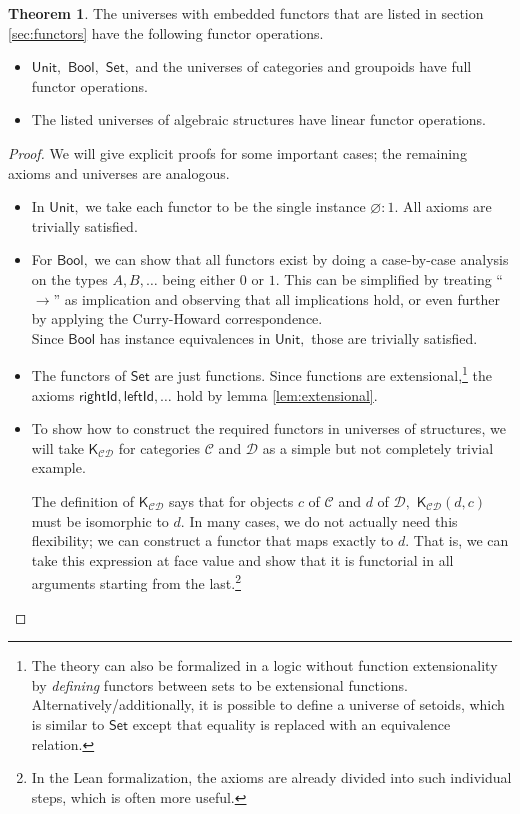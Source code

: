 \documentclass[a4paper]{article}
\theoremstyle{definition}
\newtheorem{theorem}[definition]{Theorem}
\theoremstyle{remark}
\renewcommand{\emptyset}{\varnothing}
\newcommand{\C}{\mathcal{C}}
\newcommand{\D}{\mathcal{D}}
\newcommand{\nm}{\mathsf}
\newcommand{\universe}{\nm}
\newcommand{\Unit}{\universe{Unit}}
\newcommand{\Bool}{\universe{Bool}}
\newcommand{\Set}{\universe{Set}}
\newcommand{\combinator}{\nm}
\newcommand{\constFun}{\combinator{K}}
\begin{document}
\begin{theorem}
  \label{thm:funop}
  The universes with embedded functors that are listed in section \ref{sec:functors} have the
  following functor operations.
  \begin{itemize}
    \item $\Unit,$ $\Bool,$ $\Set,$ and the universes of categories and groupoids have
    full functor operations.
    \item The listed universes of algebraic structures have linear functor operations.
  \end{itemize}
\end{theorem}

\begin{proof}
  We will give explicit proofs for some important cases; the remaining axioms and
  universes are analogous.
  \begin{itemize}
    \item In $\Unit,$ we take each functor to be the single instance $\emptyset : 1.$
    All axioms are trivially satisfied.
    \item For $\Bool,$ we can show that all functors exist by doing a case-by-case
    analysis on the types $A,B,\ldots$ being either $0$ or $1.$ This can be simplified by
    treating ``$\to$'' as implication and observing that all implications hold, or even
    further by applying the Curry-Howard correspondence\cite{Curry-Howard}.\\
    Since $\Bool$ has instance equivalences in $\Unit,$ those are trivially satisfied.
    \item The functors of $\Set$ are just functions. Since functions are
    extensional,\footnote{The theory can also be formalized in a logic without function
    extensionality by \emph{defining} functors between sets to be extensional functions.
    Alternatively/additionally, it is possible to define a universe of setoids, which
    is similar to $\Set$ except that equality is replaced with an equivalence relation.}
    the axioms $\nm{rightId},\nm{leftId},\ldots$ hold by lemma \ref{lem:extensional}.
    \item To show how to construct the required functors in universes of
    structures, we will take $\constFun_{\C\D}$ for categories $\C$ and $\D$ as a
    simple but not completely trivial example.

    The definition of $\constFun_{\C\D}$ says that for objects $c$ of $\C$ and $d$ of
    $\D,$ $\constFun_{\C\D}(d,c)$ must be isomorphic to $d.$ In many cases, we do not
    actually need this flexibility; we can construct a functor that maps exactly to
    $d.$ That is, we can take this expression at face value and show that it is
    functorial in all arguments starting from the last.\footnote{In the Lean
    formalization, the axioms are already divided into such individual steps, which is
    often more useful.}


\end{itemize}
\end{proof}
\end{document}
